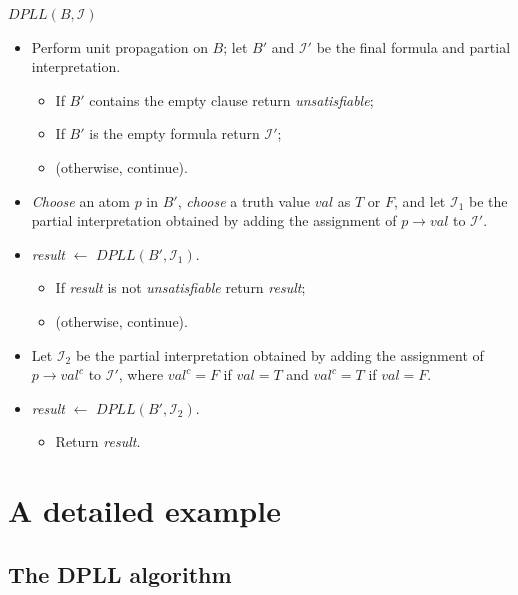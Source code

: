 \documentclass[11pt]{report}
\begin{document}
\noindent $\textit{DPLL}(B,\mathcal{I})$
\begin{itemize}

\item Perform unit propagation on $B$; let $B'$ and $\mathcal{I}'$ be
the final formula and partial interpretation.

\begin{itemize}
\item If $B'$ contains the empty clause return \emph{unsatisfiable};
\item If $B'$ is the empty formula return $\mathcal{I}'$;
\item (otherwise, continue).
\end{itemize}
\item \emph{Choose} an atom $p$ in $B'$, \emph{choose} a truth value
$\textit{val}$ as $T$ or $F$, and let $\mathcal{I}_1$ be the
partial interpretation obtained by adding the assignment of
$p\rightarrow \textit{val}$  to $\mathcal{I}'$. 

\item \textit{result} $\leftarrow$ $\textit{DPLL}(B',\mathcal{I}_1)$.
\begin{itemize}
\item If \textit{result} is not \emph{unsatisfiable} return \textit{result};
\item (otherwise, continue).
\end{itemize}

\item Let $\mathcal{I}_2$ be the partial interpretation obtained by
adding the assignment of $p\rightarrow \textit{val}^c$ to
$\mathcal{I}'$, where $\textit{val}^c = F$ if $\textit{val} = T$ and
$\textit{val}^c = T$ if $\textit{val} = F$.

\item \textit{result} $\leftarrow$ $\textit{DPLL}(B',\mathcal{I}_2)$.
\begin{itemize}
\item Return \textit{result}.
\end{itemize}
\end{itemize}



\chapter{A detailed example}\label{ch.mlm}

\section{The DPLL algorithm}
\end{document}
